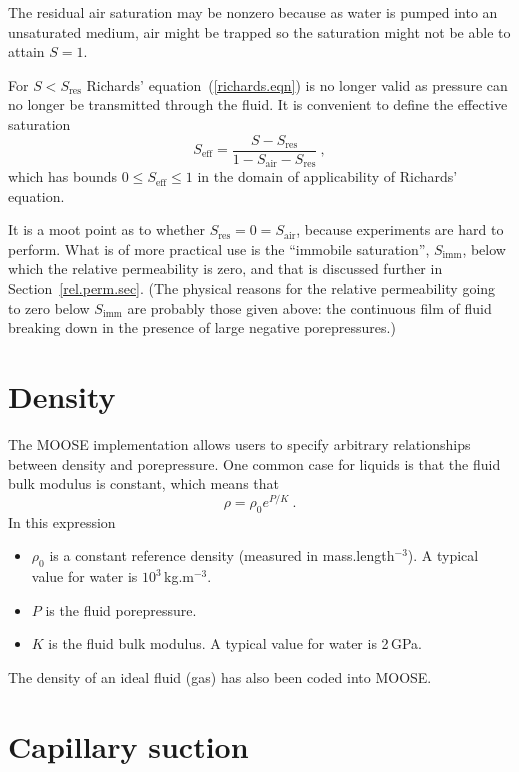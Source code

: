 \documentclass[]{scrreprt}
\begin{document}
The residual air saturation may be nonzero because as water is pumped
into an unsaturated medium, air might be trapped so the saturation
might not be able to attain $S=1$.

For $S<S_{\mathrm{res}}$ Richards' equation~(\ref{richards.eqn}) is no
longer valid as pressure can no longer be transmitted through the
fluid.  It is convenient to define the effective saturation
\begin{equation}
S_{\mathrm{eff}} = \frac{S - S_{\mathrm{res}}}{1 - S_{\mathrm{air}} -
  S_{\mathrm{res}}} \ ,
\end{equation}
which has bounds $0\leq S_{\mathrm{eff}} \leq 1$ in the domain of
applicability of Richards' equation.

It is a moot point as to whether
$S_{\mathrm{res}}=0=S_{\mathrm{air}}$, because experiments are hard to
perform.  What is of more practical use is the ``immobile
saturation'', $S_{\mathrm{imm}}$, below which the relative
permeability is zero, and that is discussed further in
Section~\ref{rel.perm.sec}.  (The physical reasons for the relative
permeability going to zero below $S_{\mathrm{imm}}$ are probably those
given above: the continuous film of fluid breaking down in the
presence of large negative porepressures.)


\section{Density}
\label{sec.density.constk}

The MOOSE implementation allows users to specify arbitrary
relationships between density and porepressure.  One common case
for liquids is that the fluid bulk modulus is constant, which means
that 
\begin{equation}
\rho = \rho_{0}e^{P/K} \ .
\end{equation}
In this expression
\begin{itemize}
\item $\rho_{0}$ is a constant reference density (measured in
  mass.length$^{-3}$).  A typical value for water is
  $10^{3}$\,kg.m$^{-3}$.
\item $P$ is the fluid porepressure.
\item $K$ is the fluid bulk modulus.  A typical value for water is
  2\,GPa.
\end{itemize}

The density of an ideal fluid (gas) has also been coded into MOOSE.

\section{Capillary suction}
\end{document}
